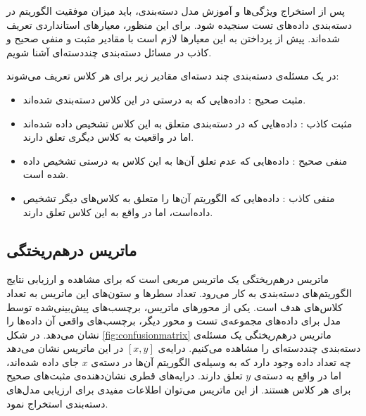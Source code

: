 \label{sec:performance}

پس از استخراج ویژگی‌ها و آموزش مدل دسته‌بندی، باید میزان موفقیت الگوریتم در دسته‌بندی داده‌های تست سنجیده شود. برای این منظور، معیارهای استانداردی تعریف شده‌اند. پیش از پرداختن به این معیارها لازم است با مقادیر مثبت و منفی صحیح و کاذب در مسائل دسته‌بندی چنددسته‌ای آشنا شویم.

در یک مسئله‌ی دسته‌بندی چند دسته‌ای مقادیر زیر برای هر کلاس تعریف می‌شوند:
\begin{itemize}
	\item مثبت صحیح : داده‌هایی که به درستی در این کلاس دسته‌بندی شده‌اند.
	\item مثبت کاذب : داده‌هایی که در دسته‌بندی متعلق به این کلاس تشخیص داده شده‌اند اما در واقعیت به کلاس دیگری تعلق دارند.
	\item منفی صحیح : داده‌هایی که عدم تعلق آن‌ها به این کلاس به درستی تشخیص داده شده است.
	\item منفی کاذب : داده‌هایی که الگوریتم آن‌ها را متعلق به کلاس‌های دیگر تشخیص داده‌است، اما در واقع به این کلاس تعلق دارند.
\end{itemize}

\subsection{ماتریس درهم‌ریختگی}
ماتریس درهم‌ریختگی یک ماتریس مربعی است که برای مشاهده و ارزیابی نتایج الگوریتم‌های دسته‌بندی به کار می‌رود. تعداد سطرها و ستون‌های این ماتریس به تعداد کلاس‌های هدف است. یکی از محورهای ماتریس، برچسب‌های پیش‌بینی‌شده توسط مدل برای داده‌های مجموعه‌ی تست و محور دیگر، برچسب‌های واقعی آن داده‌ها را نشان می‌دهد. در شکل \ref{fig:confusionmatrix} ماتریس درهم‌ریختگی یک مسئله‌ی دسته‌بندی چنددسته‌ای را مشاهده می‌کنیم. درایه‌ی $[x, y]$ در این ماتریس نشان می‌دهد چه تعداد داده وجود دارد که به وسیله‌ی الگوریتم آن‌ها در دسته‌ی $x$ جای داده شده‌اند، اما در واقع به دسته‌ی $y$ تعلق دارند. درایه‌های قطری نشان‌دهنده‌ی مثبت‌های صحیح برای هر کلاس هستند. از این ماتریس می‌توان اطلاعات مفیدی برای ارزیابی مدل‌های دسته‌بندی استخراج نمود.


